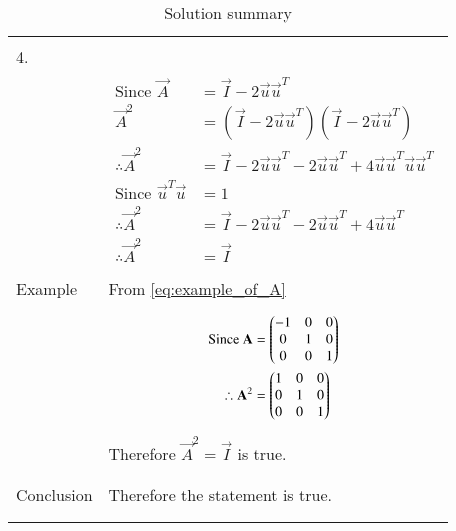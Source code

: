 \documentclass[journal,12pt]{IEEEtran}
\begin{document}
\begin{longtable}{|l|l|}
&\\
\hline
&\\
4.&\\
&\parbox{6cm}{\begin{align*}
    \mbox{Since }\vec{A}&=\vec{I}-2\vec{u}\vec{u}^T\\
    \vec{A}^2&=(\vec{I}-2\vec{u}\vec{u}^T)(\vec{I}-2\vec{u}\vec{u}^T)\\
    \therefore\vec{A}^2&=\vec{I}-2\vec{u}\vec{u}^T-2\vec{u}\vec{u}^T+4\vec{u}\vec{u}^T\vec{u}\vec{u}^T\\
    \mbox{Since }\vec{u}^T\vec{u}&=1\\
    \therefore\vec{A}^2&=\vec{I}-2\vec{u}\vec{u}^T-2\vec{u}\vec{u}^T+4\vec{u}\vec{u}^T\\
    \therefore \vec{A}^2&=\vec{I}
\end{align*}}\\
\hline
&\\
Example&From \eqref{eq:example_of_A}\\
&\parbox{6cm}{\begin{align*}
    \mbox{Since } \mathbf{A}&=\begin{pmatrix}-1&0&0\\0&1&0\\0&0&1\end{pmatrix}\\
    \therefore \mathbf{A}^2&=\begin{pmatrix}1&0&0\\0&1&0\\0&0&1\end{pmatrix}
\end{align*}}\\
&Therefore $\vec{A}^2=\vec{I}$ is true.\\
&\\
\hline
&\\
Conclusion&Therefore the statement is true.\\
&\\
\hline
\caption{Solution summary}
\label{table:2}
\end{longtable}
\end{document}
